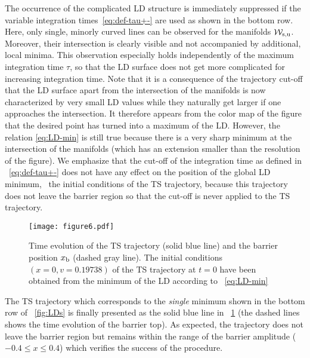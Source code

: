 \documentclass[aip,reprint,jcp,amsmath,amssymb,superscriptaddress,floatfix]{revtex4-1}
\begin{document}
The occurrence of the complicated LD structure is immediately suppressed if the 
variable integration times~\eqref{eq:def-tau+-} are used as shown in the bottom 
row.
Here, only single, minorly curved lines can be observed for the manifolds 
$\mathcal{W}_\text{s,u}$.
Moreover, their intersection is clearly visible and not accompanied by 
additional, local minima.
This observation especially holds independently of the maximum integration time 
$\tau$, so that the LD surface does not get more complicated for increasing 
integration time.
Note that it is a consequence of the trajectory cut-off that the LD surface 
apart from the intersection of the manifolds is now characterized by very small 
LD values while they naturally get larger if one approaches the intersection.
It therefore appears from the color map of the figure that the desired point 
has turned into a maximum of the LD.
However, the relation \eqref{eq:LD-min} is still true because there is a very 
sharp minimum at the intersection of the manifolds (which has an extension 
smaller than the resolution of the figure).
We emphasize that the cut-off of the integration time as defined in 
\EQ~\eqref{eq:def-tau+-} does not have any effect on the position of the global 
LD minimum, \ie~the initial conditions of the TS trajectory, because this 
trajectory does not leave the barrier region so that the cut-off is never 
applied to the TS trajectory.

\begin{figure}[t]
\texttt{[image: figure6.pdf]}
\caption{%
Time evolution of the TS trajectory (solid blue line) and the barrier position 
$x_\text{b}$ (dashed gray line).
The initial conditions $(x=0, v=0.19738)$ of the TS trajectory at $t=0$ 
have been obtained from the minimum of the LD according to \EQ~\eqref{eq:LD-min}
}
\label{fig:TS-trajectory}
\end{figure}


The TS trajectory which corresponds to the \emph{single} minimum shown in the 
bottom row of \FIG~\ref{fig:LDs} is finally presented as the solid blue line 
in \FIG~\ref{fig:TS-trajectory} (the dashed lines shows the time evolution of 
the barrier top).
As expected, the trajectory does not leave the barrier region but remains 
within the range of the barrier amplitude ($-0.4\leq x \leq 0.4$) which 
verifies the success of the procedure.
\end{document}

